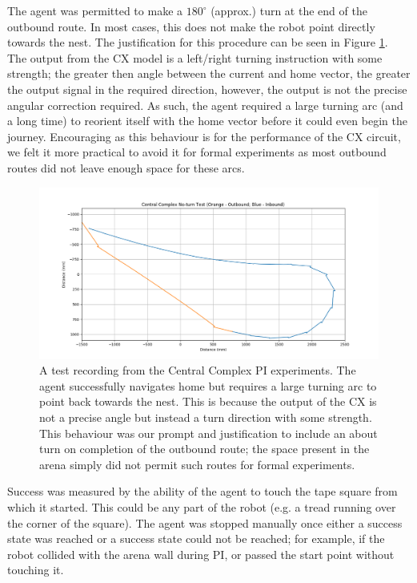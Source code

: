 \documentclass[a4paper,11pt,twoside,openright]{article}
\begin{document}
The agent was permitted to make a $180^{\circ}$ (approx.) turn at the
end of the outbound route. In most cases, this does not make the robot
point directly towards the nest. The justification for this procedure
can be seen in Figure \ref{fig:cxnt}. The output from the CX model is
a left/right turning instruction with some strength; the greater then
angle between the current and home vector, the greater the output
signal in the required direction, however, the output is not the
precise angular correction required. As such, the agent required a large
turning arc (and a long time) to reorient itself with the home vector
before it could even begin the journey. Encouraging as this behaviour
is for the performance of the CX circuit, we felt it more practical to
avoid it for formal experiments as most outbound routes did not leave
enough space for these arcs.
\newline\par

\begin{figure}[h!]
  \centering
  \includegraphics[width=\textwidth]{CXNT}
  \caption{\label{fig:cxnt} A test recording from the Central Complex
    PI experiments. The agent successfully navigates home but requires a large
    turning arc to point back towards the nest. This is because the output of the
    CX is not a precise angle but instead a turn direction with some strength.
    This behaviour was our prompt and justification to include an about turn on
    completion of the outbound route; the space present in the arena simply did
    not permit such routes for formal experiments.
  }
\end{figure}

Success was measured by the ability of the agent to touch the tape
square from which it started. This could be any part of the robot
(e.g. a tread running over the corner of the square). The agent was
stopped manually once either a success state was reached or a success
state could not be reached; for example, if the robot collided with
the arena wall during PI, or passed the start point without touching it.
\newline\par
\end{document}
